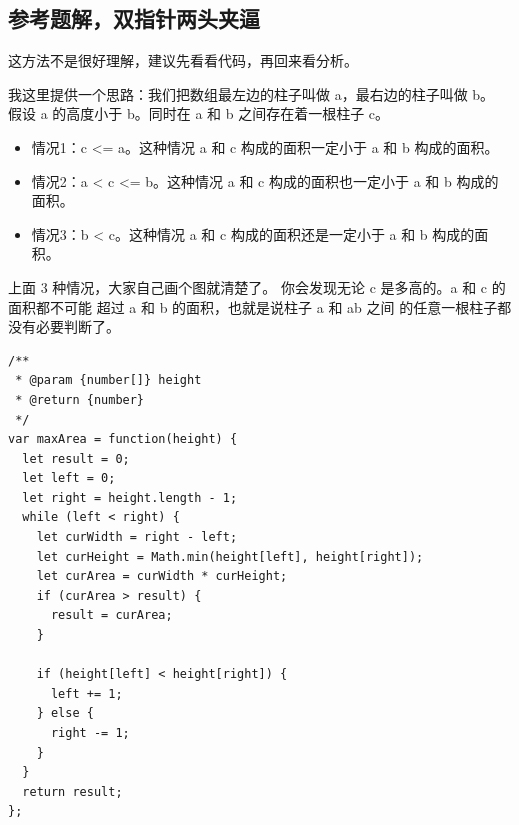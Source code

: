 \subsection{参考题解，双指针两头夹逼}

这方法不是很好理解，建议先看看代码，再回来看分析。

我这里提供一个思路：我们把数组最左边的柱子叫做 a，最右边的柱子叫做 b。
假设 a 的高度小于 b。同时在 a 和 b 之间存在着一根柱子 c。

\begin{itemize}
  \item 情况1：c <= a。这种情况 a 和 c 构成的面积一定小于 a 和 b 构成的面积。
  \item 情况2：a < c <= b。这种情况 a 和 c 构成的面积也一定小于 a 和 b 构成的面积。
  \item 情况3：b < c。这种情况 a 和 c 构成的面积还是一定小于 a 和 b 构成的面积。
\end{itemize}

上面 3 种情况，大家自己画个图就清楚了。
你会发现无论 c 是多高的。a 和 c 的面积都不可能
超过 a 和 b 的面积，也就是说柱子 a 和 ab 之间
的任意一根柱子都没有必要判断了。

\begin{verbatim}
/**
 * @param {number[]} height
 * @return {number}
 */
var maxArea = function(height) {
  let result = 0;
  let left = 0;
  let right = height.length - 1;
  while (left < right) {
    let curWidth = right - left;
    let curHeight = Math.min(height[left], height[right]);
    let curArea = curWidth * curHeight;
    if (curArea > result) {
      result = curArea;
    }

    if (height[left] < height[right]) {
      left += 1;
    } else {
      right -= 1;
    }
  }
  return result;
};
\end{verbatim}
